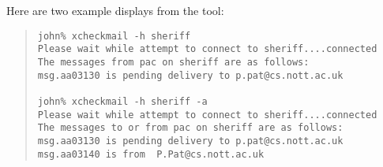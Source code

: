 Here are two example displays from the  tool:
\begin{quote}\small\begin{verbatim}
john% xcheckmail -h sheriff
Please wait while attempt to connect to sheriff....connected
The messages from pac on sheriff are as follows:
msg.aa03130 is pending delivery to p.pat@cs.nott.ac.uk

john% xcheckmail -h sheriff -a
Please wait while attempt to connect to sheriff....connected
The messages to or from pac on sheriff are as follows:
msg.aa03130 is pending delivery to p.pat@cs.nott.ac.uk
msg.aa03140 is from  P.Pat@cs.nott.ac.uk
\end{verbatim}\end{quote}
